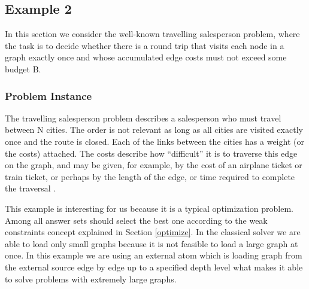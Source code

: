 \documentclass[a4paper, titlepage]{article}
\begin{document}
\subsection{Example 2}
\label{traveling}
In this section we consider the well-known travelling 
salesperson problem, where the task is to decide whether there 
is a round trip that visits each node in a graph exactly 
once and whose accumulated edge costs must not exceed some 
budget B.

\subsubsection{Problem Instance}
The travelling salesperson problem describes a salesperson who 
must travel between N cities. The order is not relevant as long as all cities are visited exactly once and the route is closed. Each of the 
links between the cities has a weight (or the 
costs) attached. The costs describe how ``difficult'' it is to 
traverse this edge on the graph, and may be given, for 
example, by the cost of an airplane ticket or train ticket, 
or perhaps by the length of the edge, or time required to 
complete the traversal \cite{wiki}.

This example is interesting for us because it is a typical 
optimization problem. Among all answer sets \dlvhex{} 
should select the best one according to the weak constraints 
concept explained in Section \ref{optimize}. In the 
classical solver we are able to load only small graphs 
because it is not feasible to load a large graph at once. In 
this example we are using an external atom which is loading 
graph from the external source edge by edge up to a  specified 
depth level what makes it able to solve problems with 
extremely large graphs.        
\end{document}
